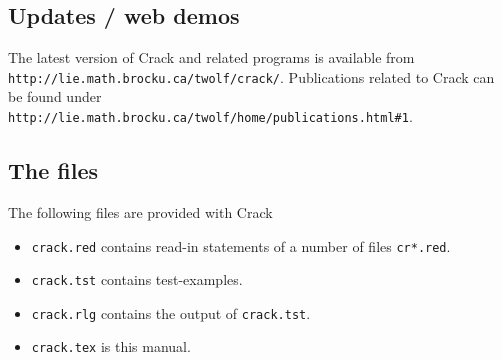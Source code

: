 \documentclass[12pt]{article}
\begin{document}
\subsection{Updates / web demos}
The latest version of {\sc Crack} and related programs
is available from \\
\verb+http://lie.math.brocku.ca/twolf/crack/+.
Publications related to {\sc Crack} can be found under  \\
\verb+http://lie.math.brocku.ca/twolf/home/publications.html#1+.

\subsection{The files}
The following files are provided with {\sc Crack}
\begin{itemize}
\item {\tt crack.red} contains read-in statements of a number
of files {\tt cr*.red}.
\item {\tt crack.tst} contains test-examples.
\item {\tt crack.rlg} contains the output of {\tt crack.tst}.
\item {\tt crack.tex} is this manual.
\end{itemize}
\end{document}
